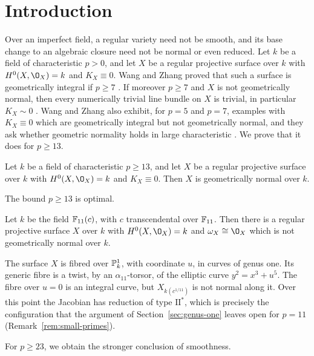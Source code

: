 \section{Introduction}\label{sec:intro}

Over an imperfect field, a regular variety need not be smooth, and its base change to an algebraic closure need not be normal or even reduced.
Let $k$ be a field of characteristic $p>0$, and let $X$ be a regular projective surface over $k$ with $H^0(X,\O_X) = k$ and $K_X \equiv 0$.
Wang and Zhang proved that such a surface is geometrically integral if $p\geq 7$ \cite[Theorem~1.2]{WZ26}.
If moreover $p\geq 7$ and $X$ is not geometrically normal, then every numerically trivial line bundle on $X$ is trivial, in particular $K_X\sim 0$ \cite[Corollary~6.2]{CWZ26}.
Wang and Zhang also exhibit, for $p = 5$ and $p = 7$, examples with $K_X \equiv 0$ which are geometrically integral but not geometrically normal, and they ask whether geometric normality holds in large characteristic \cite[Question~1.1 and Remark~1.5(2)]{WZ26}.
We prove that it does for $p\geq 13$.

\begin{theorem}\label{thm:main}
Let $k$ be a field of characteristic $p\geq 13$, and let $X$ be a regular projective surface over $k$ with $H^0(X,\O_X) = k$ and $K_X\equiv 0$.
Then $X$ is geometrically normal over $k$.
\end{theorem}

The bound $p\geq 13$ is optimal.

\begin{theorem}\label{thm:intro-p11}
Let $k$ be the field $\mathbb{F}_{11}(c)$, with $c$ transcendental over $\mathbb{F}_{11}$.
Then there is a regular projective surface $X$ over $k$ with $H^0(X,\O_X) = k$ and $\omega_X\cong\O_X$ which is not geometrically normal over $k$.
\end{theorem}

The surface $X$ is fibred over $\mathbb{P}^1_k$, with coordinate $u$, in curves of genus one.
Its generic fibre is a twist, by an $\alpha_{11}$-torsor, of the elliptic curve $y^2 = x^3+u^5$.
The fibre over $u = 0$ is an integral curve, but $X_{k(c^{1/11})}$ is not normal along it.
Over this point the Jacobian has reduction of type $\mathrm{II}^*$, which is precisely the configuration that the argument of Section~\ref{sec:genus-one} leaves open for $p = 11$ (Remark~\ref{rem:small-primes}).

\smallskip
For $p\geq 23$, we obtain the stronger conclusion of smoothness.

